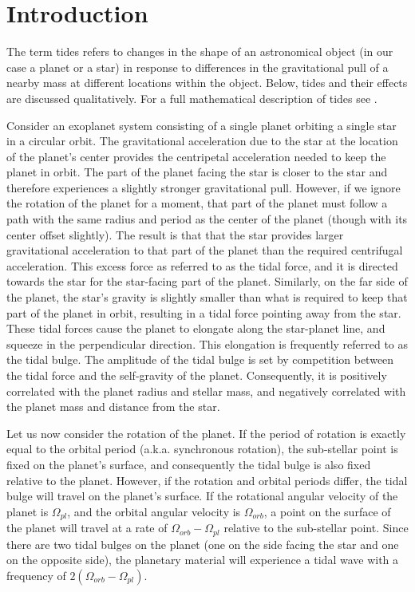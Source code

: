\section{Introduction}
%
\label{sec:introduction}

The term tides refers to changes in the shape of an astronomical object (in our
case a planet or a star) in response to differences in the gravitational pull of
a nearby mass at different locations within the object. Below, tides and their
effects are discussed qualitatively. For a full mathematical description of
tides see \cite{Murray_Dermott_book}.

Consider an exoplanet system consisting of a single planet orbiting a single
star in a circular orbit. The gravitational acceleration due to the star at the
location of the planet's center provides the centripetal acceleration needed to
keep the planet in orbit. The part of the planet facing the star is closer to
the star and therefore experiences a slightly stronger gravitational pull.
However, if we ignore the rotation of the planet for a moment, that part of the
planet must follow a path with the same radius and period as the center of the
planet (though with its center offset slightly). The result is that that the
star provides larger gravitational acceleration to that part of the planet than
the required centrifugal acceleration. This excess force as referred to as the
tidal force, and it is directed towards the star for the star-facing part of the
planet. Similarly, on the far side of the planet, the star's gravity is slightly
smaller than what is required to keep that part of the planet in orbit,
resulting in a tidal force pointing away from the star. These tidal forces cause
the planet to elongate along the star-planet line, and squeeze in the
perpendicular direction. This elongation is frequently referred to as the tidal
bulge. The amplitude of the tidal bulge is set by competition between the tidal
force and the self-gravity of the planet. Consequently, it is positively
correlated with the planet radius and stellar mass, and negatively correlated
with the planet mass and distance from the star. 

Let us now consider the rotation of the planet. If the period of rotation is
exactly equal to the orbital period (a.k.a. synchronous rotation), the
sub-stellar point is fixed on the planet's surface, and consequently the tidal
bulge is also fixed relative to the planet. However, if the rotation and orbital
periods differ, the tidal bulge will travel on the planet's surface. If the
rotational angular velocity of the planet is $\Omega_{pl}$, and the orbital
angular velocity is $\Omega_{orb}$, a point on the surface of the planet will
travel at a rate of $\Omega_{orb} - \Omega_{pl}$ relative to the sub-stellar
point. Since there are two tidal bulges on the planet (one on the side facing
the star and one on the opposite side), the planetary material will experience a
tidal wave with a frequency of $2(\Omega_{orb} - \Omega_{pl})$.

